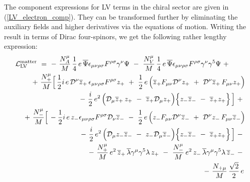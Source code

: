 \documentclass[12pt]{revtex4}
\begin{document}
The component expressions for LV terms in the chiral sector are given 
in (\ref{LV_electron_comp}). They can be transformed further 
by eliminating the auxiliary fields and higher derivatives 
via the equations of motion. Writing the result in terms of Dirac
four-spinors, we get the following rather lengthy expression:
\begin{eqnarray}
\nonumber
\lefteqn{
     \mathcal{L}_{\mathrm{LV}}^{\mathrm{matter}}  ~= 
~      %
-~
\frac{N_A^\mu}{M}\,
\frac{1}{4} \,e\,
\overline{\Psi} \epsilon_{\mu\nu\rho\sigma}
F^{\rho\sigma} \gamma^\nu \Psi      
~-~
\frac{N_V^\mu}{M}\,
\frac{1}{4} \,e\,
\overline{\Psi} \epsilon_{\mu\nu\rho\sigma}
F^{\rho\sigma} \gamma^\nu \gamma^5 \Psi 
~+~ 
}\\
\nonumber
&&
~+~
\frac{N_+^\mu}{M}
\Big[\,
\frac{1}{2}i \,e \, 
\mathcal{D}^\nu \overline{z}_+ \,
\epsilon_{\mu\nu\rho\sigma}F^{\rho\sigma} z_+ 
~+~
\frac{1}{2}\, e\,
\Big(
  \overline{z}_+ F_{\mu\nu}
  \mathcal{D}^\nu z_+ 
  ~+~
  \mathcal{D}^\nu \overline{z}_+ \,
  F_{\mu\nu} z_+
\Big) 
\\
\nonumber
&&
               \qquad
~-~
\frac{i}{2}\, e^2\,
\Big(
  \mathcal{D}_\mu \overline{z}_+ \,
   z_+ 
  ~-~
  \overline{z}_+ \mathcal{D}_\mu z_+
\Big)
\Big\{
  z_-  \overline{z}_- 
  ~-~
  \overline{z}_+  z_+
\Big\}
\,\Big] ~+~ \\
\nonumber
&&
~+~
\frac{N_-^\mu}{M}
\Big[\,
- \frac{1}{2} i\, e\,
z_- \epsilon_{\mu\nu\rho\sigma}F^{\rho\sigma}
\mathcal{D}_\nu \overline{z}_- 
~-~
\frac{1}{2}\, e\,
\Big(
  z_- F_{\mu\nu}\mathcal{D}^\nu \overline{z}_- 
  ~+~
  \mathcal{D}^\nu z_- \,
  F_{\mu\nu} \overline{z}_- 
\Big)
\\
\nonumber
&&
               \qquad
~-~ 
\frac{i}{2}\, e^2\,
\Big(
  \mathcal{D}_\mu z_- \overline{z}_-
  ~-~
  z_- \mathcal{D}_\mu \overline{z}_-
\Big)
\Big\{
  z_- \overline{z}_- 
  ~-~
  \overline{z}_+ z_+
\Big\}
\,\Big]
~-~ \\
\nonumber
&&
~-~
\frac{N_+^\mu}{M}\, e^2\,
\overline{z}_+ \, \overline{\lambda} \gamma^\mu \gamma^5 
\lambda\, z_+ 
~-~
\frac{N_-^\mu}{M}\, e^2\,
z_-\, \overline{\lambda}\gamma^\mu\gamma^5
\lambda\, \overline{z}_-
~-~ \\
\nonumber
&&
~-~
\frac{N_{+\mu}}{M}\,
\frac{\sqrt{2}}{2}\, e\,

\end{eqnarray}
\end{document}
